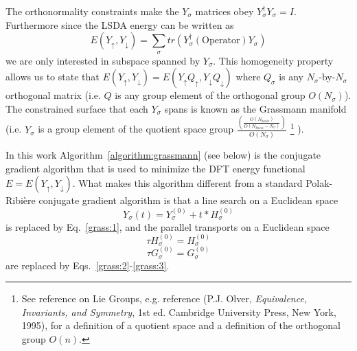 The orthonormality constraints make the $Y_{\sigma}$ matrices
obey $Y_{\sigma}^{\dag}Y_{\sigma}=I$. 
Furthermore since the LSDA energy can be written as
\begin{equation}
E(Y_{\uparrow},Y_{\downarrow}) = \sum_{\sigma} 
        tr \left( Y_{\sigma}^{\dag} (\mathrm{Operator}) Y_{\sigma} \right)
\end{equation}
we are only interested in subspace spanned by $Y_\sigma$.
This homogeneity property allows us to state that
$E(Y_{\uparrow},Y_{\downarrow}) = E(Y_{\uparrow}Q_{\uparrow},Y_{\downarrow}Q_{\downarrow})$ 
where $Q_{\sigma}$ is any $N_{\sigma}$-by-$N_{\sigma}$
orthogonal matrix (i.e. $Q$ is any group element of the orthogonal
group $O(N_{\sigma})$).  The constrained surface that each $Y_{\sigma}$ spans
is known as the Grassmann manifold (i.e. $Y_{\sigma}$ is a group element
of the quotient space group 
$\frac{\left(\frac{O(N_{basis})}{O(N_{basis}-N_{\sigma})}\right)}{O(N_{\sigma})}$
\footnote{See reference on Lie Groups, e.g. reference (P.J. Olver, 
\textit{Equivalence, Invariants, and Symmetry}, 1st ed. Cambridge University Press,
New York, 1995), for a definition of a quotient space and a definition of the 
          orthogonal group $O(n)$.
         }
).

In this work Algorithm~\ref{algorithm:grassmann} (see below) is the 
conjugate gradient
algorithm that is used to minimize the DFT energy functional
$E=E\left( Y_{\uparrow},Y_{\downarrow} \right)$.  What makes this
algorithm different from a standard 
Polak-Ribi\`{e}re conjugate gradient algorithm
is that a line search on a Euclidean space 
\[ Y_{\sigma}(t) = Y_{\sigma}^{(0)} + t*H_{\sigma}^{(0)} \]
is replaced by Eq.~\ref{grass:1}, 
and the parallel transports on a Euclidean space
\[ \tau H_{\sigma}^{(0)} = H_{\sigma}^{(0)} \]
\[ \tau G_{\sigma}^{(0)} = G_{\sigma}^{(0)} \]
are replaced by Eqs.~\ref{grass:2}-\ref{grass:3}.

